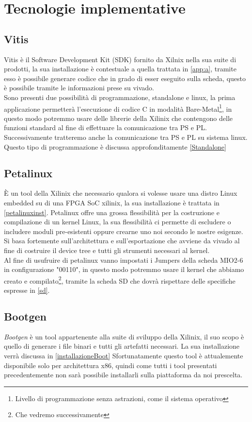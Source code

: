 \section{Tecnologie implementative}
\subsection{Vitis}
Vitis è il Software Development Kit (SDK) fornito da Xilnix nella sua suite di prodotti, la sua installazione è contestuale a quella trattata in \ref{app:a}, tramite esso è possibile generare codice che in grado di esser eseguito sulla scheda, questo è possibile tramite le informazioni prese su vivado.\\
Sono presenti due possibilità di programmazione, standalone e linux, la prima applicazione permetterà l'esecuzione di codice C in modalità Bare-Metal\footnote{Livello di programmazione senza astrazioni, come il sistema operativo}, in questo modo potremmo usare delle librerie della Xilinix che contengono delle funzioni standard al fine di effettuare la comunicazione tra PS e PL. Successivamente tratteremo anche la comunicazione tra PS e PL su sistema linux. Questo tipo di programmazione è discussa approfonditamente \ref{Standalone}
\subsection{Petalinux}
È un tool della Xilinix che necessario qualora si volesse usare una distro Linux embedded su di una FPGA SoC xilinix, la sua installazione è trattata in \ref{petalinuxinst}. Petalinux offre una grossa flessibilità per la costruzione e compilazione di un kernel Linux, la sua flessibilità ci permette di escludere o includere moduli pre-esistenti oppure crearne uno noi secondo le nostre esigenze. Si basa fortemente sull'architettura e sull'esportazione che avviene da vivado al fine di costruire il device tree e tutti gli strumenti necessari al kernel.\\
Al fine di usufruire di petalinux vanno impostati i Jumpers della scheda MIO2-6 in configurazione  "00110", in questo modo potremmo usare il kernel che abbiamo creato e compilato\footnote{Che vedremo successivamente}, tramite la scheda SD che dovrà rispettare delle specifiche espresse in \ref{sd}.
\subsection{Bootgen}
\textit{Bootgen} è un tool appartenente alla suite di sviluppo della Xilinix, il suo scopo è quello di generare i file binari e tutti gli artefatti necessari. La sua installazione verrà discussa in \ref{installazioneBoot}
Sfortunatamente questo tool è attualemente disponibile solo per architettura x86, quindi come tutti i tool presentati precedentemente non sarà possibile installarli sulla piattaforma da noi prescelta.\clearpage
